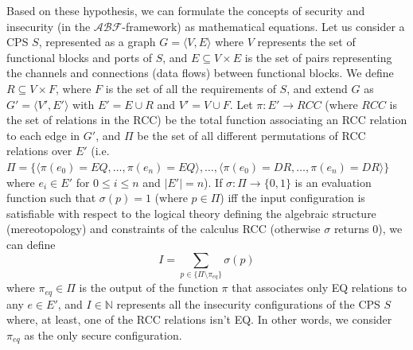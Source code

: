\documentclass[conference]{IEEEtran}
\newcommand{\assertionRegion}{\mathcal{A}}
\newcommand{\beliefRegion}{\mathcal{B}}
\newcommand{\factRegion}{\mathcal{F}}
\newcommand{\abftheory}{\assertionRegion\beliefRegion\factRegion}
\begin{document}
Based on these hypothesis, we can formulate the concepts of security and
insecurity (in the $\abftheory$-framework) as mathematical equations.  Let us
consider a CPS $S$, represented as a graph $G=\langle V,E\rangle$ where $V$
represents the set of functional blocks and ports of $S$, and $E\subseteq
V\times E$ is the set of pairs representing the channels and connections (data
flows) between functional blocks. We define $R\subseteq V\times F$, where $F$
is the set of all the requirements of $S$, and extend $G$ as $G'=\langle V',E'\rangle$ with $E'= E\cup R$ and $V'=V\cup F$. Let $\pi:
E'\rightarrow RCC$ (where $RCC$ is the set of relations in the RCC) be the
total function associating an RCC relation to each edge in $G'$, and $\Pi$ be
the set of all different permutations of RCC relations over $E'$ (i.e.
$\Pi=\{\langle\pi(e_0)=EQ,\ldots,\pi(e_n)=EQ\rangle,\ldots,\langle
\pi(e_0)=DR,\ldots,\pi(e_n)=DR\rangle\}$ where $e_i\in E'$ for $0\leq i \leq n$ and $|E'|=n$). If $\sigma:\Pi\rightarrow\{0,1\}$ is
an evaluation function such that $\sigma(p)=1$ (where $p\in\Pi$) iff the input
configuration is satisfiable with respect to the logical theory defining the
algebraic structure (mereotopology) and constraints of the calculus RCC
(otherwise $\sigma$ returns $0$), we can define
\begin{displaymath}
	I=\sum_{p\in\{\Pi\setminus\pi_{eq}\}} \sigma(p)
\end{displaymath}
where $\pi_{eq}\in\Pi$ is the output of the function $\pi$ that associates only EQ relations
to any $e\in E'$, and $I\in\mathbb{N}$ represents all the insecurity configurations
of the CPS $S$ where, at least, one of the RCC relations isn't EQ.
In other words, we consider $\pi_{eq}$ as the only secure configuration.

%
\end{document}

